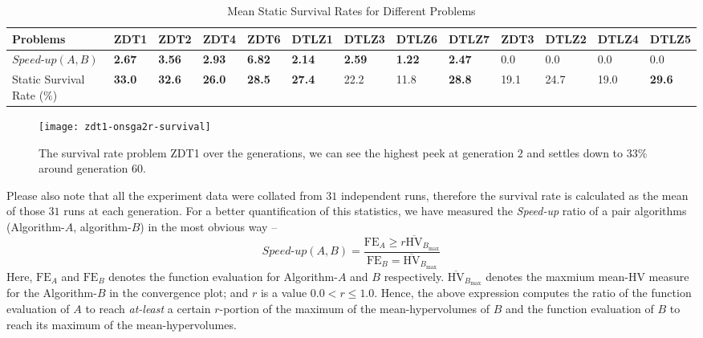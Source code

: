 \documentclass[journal]{IEEEtran}
\let\MYoriglatexcaption\caption
\renewcommand{\caption}[2][\relax]{\MYoriglatexcaption[#2]{#2}}
\begin{document}
%
\begin{table*}[tp!]
	\caption{Mean Static Survival Rates for Different Problems}
	\label{table:survival}
	\centering
	{\renewcommand{\arraystretch}{1.5}
	\begin{tabular}{l|llllllll|llll}
	Problems		& ZDT1 & ZDT2 & ZDT4 & ZDT6 & DTLZ1 & DTLZ3 & DTLZ6 & DTLZ7 & ZDT3 & DTLZ2 & DTLZ4 & DTLZ5\\ \hline
	$\textit{Speed-up}(A,B)$	& \textbf{2.67} & \textbf{3.56} & \textbf{2.93} & \textbf{6.82} & \textbf{2.14} & \textbf{2.59} & \textbf{1.22} & \textbf{2.47} & 0.0 & 0.0 & 0.0 & 0.0\\ \hline
	Static Survival Rate (\(\%\))	& \textbf{33.0} & \textbf{32.6}	& \textbf{26.0} & \textbf{28.5} & \textbf{27.4} & 22.2 & 11.8 & \textbf{28.8} & 19.1 & 24.7 & 19.0 & \textbf{29.6}\\ \hline
	\end{tabular}}
\end{table*}
%
\begin{figure}[tp]
	\centering
	\texttt{[image: zdt1-onsga2r-survival]}
	\caption{The survival rate problem ZDT1 over the generations, we can see the highest peek at generation \(2\) and settles down to \(33\%\) around generation \(60\).}
	\label{plot:zdt1-survival}
\end{figure}
%
Please also note that all the experiment data were collated from \(31\) independent runs, therefore the survival rate is calculated as the mean of those \(31\) runs at each generation. For a better quantification of this statistics, we have measured the \textit{Speed-up} ratio of a pair algorithms (Algorithm-\(A\), algorithm-\(B\)) in the most obvious way --
%
\begin{equation}
	\textit{Speed-up}(A,B) = \frac{\text{FE}_A \ge r \overline{\text{HV}}_{B_{\text{max}}}}{\text{FE}_B = \overline{\text{HV}}_{B_{\text{max}}}}
	\label{eq:speed-up}
\end{equation}
%
Here, \(\text{FE}_A\) and \(\text{FE}_B\) denotes the function evaluation for Algorithm-\(A\) and \(B\) respectively. \(\overline{\text{HV}}_{B_{\text{max}}}\) denotes the maxmium mean-HV measure for the Algorithm-\(B\) in the convergence plot; and \(r\) is a value \(0.0 < r \le 1.0\). Hence, the above expression computes the ratio of the function evaluation of \(A\) to reach \textit{at-least} a certain \(r\)-portion of the maximum of the mean-hypervolumes of \(B\) and the function evaluation of \(B\) to reach its maximum of the mean-hypervolumes. 
\end{document}

